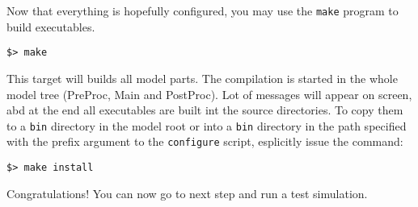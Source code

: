 Now that everything is hopefully configured, you may use the \verb=make=
program to build executables.

\begin{Verbatim}
$> make
\end{Verbatim}

This target will builds all model parts. 
The compilation is started in the whole model tree (PreProc, Main and PostProc).
Lot of messages will appear on screen, abd at the end all executables are built
int the source directories.
To copy them to a \verb=bin= directory in the model root or into a \verb=bin=
directory in the path specified with the prefix argument to the \verb=configure=
script, esplicitly issue the command:

\begin{Verbatim}
$> make install
\end{Verbatim}

Congratulations! You can now go to next step and run a test simulation.
